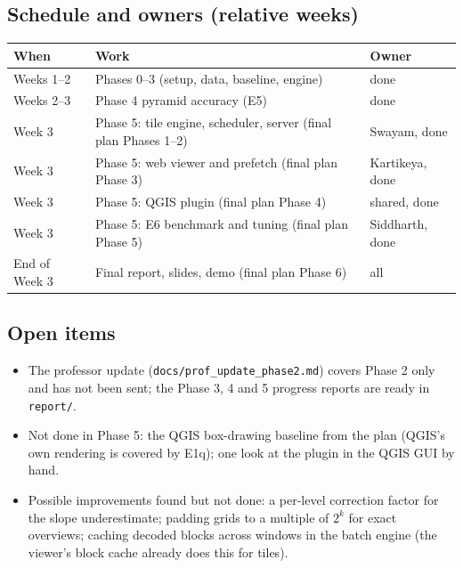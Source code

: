 ﻿\documentclass[11pt,a4paper]{article}
\newcommand{\code}[1]{\texttt{#1}}
\begin{document}
\subsection{Schedule and owners (relative weeks)}
\noindent\begin{tabularx}{\linewidth}{lLl}
\toprule
When & Work & Owner \\
\midrule
Weeks 1--2 & Phases 0--3 (setup, data, baseline, engine) & done \\
Weeks 2--3 & Phase 4 pyramid accuracy (E5) & done \\
Week 3 & Phase 5: tile engine, scheduler, server (final plan Phases 1--2) & Swayam, done \\
Week 3 & Phase 5: web viewer and prefetch (final plan Phase 3) & Kartikeya, done \\
Week 3 & Phase 5: QGIS plugin (final plan Phase 4) & shared, done \\
Week 3 & Phase 5: E6 benchmark and tuning (final plan Phase 5) & Siddharth, done \\
End of Week 3 & Final report, slides, demo (final plan Phase 6) & all \\
\bottomrule
\end{tabularx}

\subsection{Open items}
\begin{itemize}
  \item The professor update (\code{docs/prof\_update\_phase2.md}) covers Phase 2 only and has not been sent; the Phase 3, 4
  and 5 progress reports are ready in \code{report/}.
  \item Not done in Phase 5: the QGIS box-drawing baseline from the plan (QGIS's own rendering is covered by E1q); one look
  at the plugin in the QGIS GUI by hand.
  \item Possible improvements found but not done: a per-level correction factor for the slope underestimate; padding grids
  to a multiple of $2^k$ for exact overviews; caching decoded blocks across windows in the batch engine (the viewer's
  block cache already does this for tiles).
\end{itemize}
\end{document}
